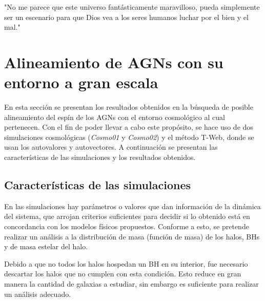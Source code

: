 \begin{savequote}[60mm]
"No me parece que este universo fantásticamente maravilloso, pueda simplemente ser un escenario para que Dios vea a los seres humanos luchar por el bien y el mal."
\end{savequote}




\chapter{Alineamiento de AGNs con su entorno a gran escala}
\label{cha:cosmic_web}

En esta sección se presentan los resultados obtenidos en la búsqueda de posible alineamiento del espín de los AGNs con el entorno cosmológico al cual pertenecen. Con el fin de poder llevar a cabo este propósito, se hace uso de dos simulaciones cosmológicas ({\it{Cosmo01}} y {\it{Cosmo02}}) y el método T-Web, donde se usan los autovalores y autovectores. A continuación se presentan las características de las simulaciones y  los resultados obtenidos.

\section{Características de las simulaciones}
\label{sec: propiedades en las simulaciones}

En las simulaciones hay parámetros o valores que dan información de la dinámica del sistema, que arrojan criterios suficientes para decidir si lo obtenido está en concordancia con los modelos físicos propuestos. 
Conforme a esto, se pretende realizar un análisis a la distribución de masa (función de masa) de los halos, BHs y de masa estelar del halo. 

Debido a que no todos los halos hospedan un BH en su interior, fue necesario descartar los halos que no cumplen con esta condición. Esto reduce en gran manera la cantidad de galaxias a estudiar, sin embargo es suficiente para realizar un análisis adecuado.

